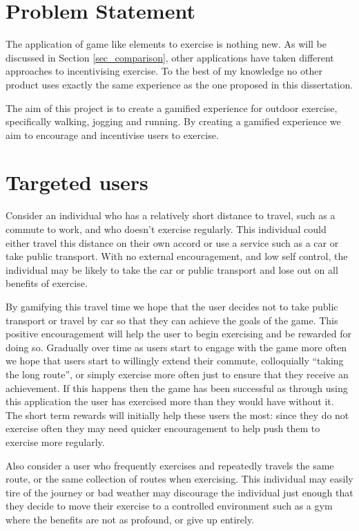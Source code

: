\section{Problem Statement}

The application of game like elements to exercise is nothing new. As
will be discussed in Section \ref{sec_comparison}, other applications
have taken different approaches to incentivising exercise. To the best
of my knowledge no other product uses exactly the same experience
as the one proposed in this dissertation.

The aim of this project is to create a gamified experience for outdoor
exercise, specifically walking, jogging and running. By creating a
gamified experience we aim to encourage and incentivise users to
exercise. 

\section{Targeted users}
\label{sec:targeted_users}
Consider an individual who has a relatively short distance to travel,
such as a commute to work,
and who doesn't exercise regularly. This individual could either
travel this distance on their own accord or use a service such as a
car or take public transport. With no external encouragement, and low
self control, the individual may be likely to take the car or public
transport and lose out on all benefits of exercise. 

By gamifying this travel time we hope that the user decides not to
take public transport or travel by car so that they can achieve the
goals of the game. This positive encouragement will help the user to
begin exercising and be rewarded for doing so. Gradually over time as
users start to engage with the game more often we hope that users
start to willingly extend their commute, colloquially ``taking the
long route'', or simply exercise more often just to ensure that they
receive an achievement. If this happens then the game has been
successful as through using this application the user has exercised
more than they would have without it. The short term rewards will
initially help these users the most: since they do not exercise
often they may need quicker encouragement to help push them to
exercise more regularly.

Also consider a user who frequently exercises and repeatedly travels
the same route, or the same collection of routes when exercising. This
individual may easily tire of the journey or bad weather may
discourage the individual just enough that they decide to move their
exercise to a controlled environment such as a gym where the benefits
are not as profound, or give up entirely. 

